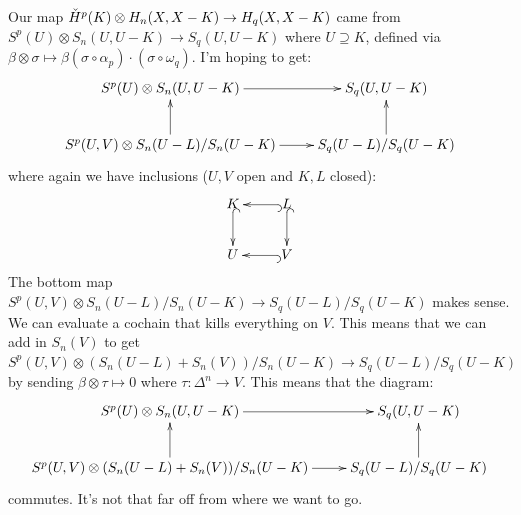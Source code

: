 Our map $\check{H}^p(K)\otimes H_n(X,X-K)\to H_q(X,X-K)$ came from $S^p(U)\otimes S_n(U,U-K)\to S_q(U,U-K)$ where $U\supseteq K$, defined via $\beta\otimes\sigma\mapsto\beta(\sigma\circ\alpha_p)\cdot(\sigma\circ\omega_q)$. I'm hoping to get:
\begin{equation*}
\xymatrix{
	S^p(U)\otimes S_n(U,U-K)\ar[r] & S_q(U,U-K)\\
	S^p(U,V)\otimes S_n(U-L)/S_n(U-K)\ar[r]\ar[u] & S_q(U-L)/S_q(U-K)\ar[u]
}
\end{equation*}
where again we have inclusions ($U,V$ open and $K,L$ closed):
\begin{equation*}
\xymatrix{K\ar@{^(->}[d] & L\ar@{^(->}[d]\ar@{^(->}[l] \\ U & V\ar@{^(->}[l]}
\end{equation*}
The bottom map $S^p(U,V)\otimes S_n(U-L)/S_n(U-K)\to S_q(U-L)/S_q(U-K)$ makes sense. We can evaluate a cochain that kills everything on $V$. This means that we can add in $S_n(V)$ to get $S^p(U,V)\otimes (S_n(U-L)+S_n(V))/S_n(U-K)\to S_q(U-L)/S_q(U-K)$ by sending $\beta\otimes\tau\mapsto 0$ where $\tau:\Delta^n\to V$. This means that the diagram:
\begin{equation*}
\xymatrix{
	S^p(U)\otimes S_n(U,U-K)\ar[r] & S_q(U,U-K)\\
	S^p(U,V)\otimes (S_n(U-L)+S_n(V))/S_n(U-K)\ar[r]\ar[u] & S_q(U-L)/S_q(U-K)\ar[u]
}
\end{equation*}
commutes. It's not that far off from where we want to go.

